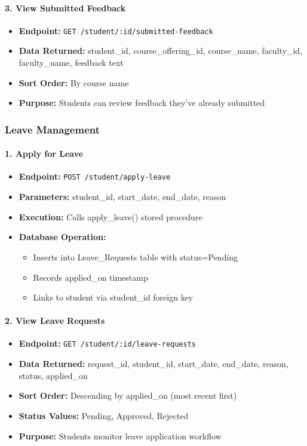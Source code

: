 \documentclass[12pt]{article}
\begin{document}
\paragraph{3. View Submitted Feedback}
\begin{itemize}
    \item \textbf{Endpoint:} \texttt{GET /student/:id/submitted-feedback}
    \item \textbf{Data Returned:} student\_id, course\_offering\_id, course\_name, faculty\_id, faculty\_name, feedback text
    \item \textbf{Sort Order:} By course name
    \item \textbf{Purpose:} Students can review feedback they've already submitted
\end{itemize}

\subsubsection{Leave Management}

\paragraph{1. Apply for Leave}
\begin{itemize}
    \item \textbf{Endpoint:} \texttt{POST /student/apply-leave}
    \item \textbf{Parameters:} student\_id, start\_date, end\_date, reason
    \item \textbf{Execution:} Calls apply\_leave() stored procedure
    \item \textbf{Database Operation:}
        \begin{itemize}
            \item Inserts into Leave\_Requests table with status=Pending
            \item Records applied\_on timestamp
            \item Links to student via student\_id foreign key
        \end{itemize}
\end{itemize}

\paragraph{2. View Leave Requests}
\begin{itemize}
    \item \textbf{Endpoint:} \texttt{GET /student/:id/leave-requests}
    \item \textbf{Data Returned:} request\_id, student\_id, start\_date, end\_date, reason, status, applied\_on
    \item \textbf{Sort Order:} Descending by applied\_on (most recent first)
    \item \textbf{Status Values:} Pending, Approved, Rejected
    \item \textbf{Purpose:} Students monitor leave application workflow
\end{itemize}
\end{document}
